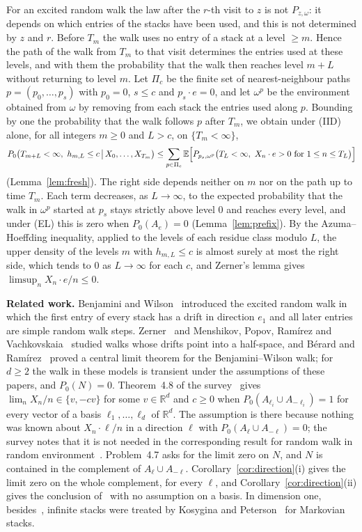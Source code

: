 \documentclass[11pt]{amsart}
\theoremstyle{remark}
\newcommand{\R}{\mathbb{R}}
\newcommand{\E}{\mathbb{E}}
\begin{document}
For an excited random walk the law after the $r$-th visit to $z$ is not $P_{z,\omega}$: it depends on which entries
of the stacks have been used, and this is not determined by $z$ and $r$. Before $T_m$ the walk uses no entry of a stack
at a level $\ge m$. Hence the path of the walk from $T_m$ to that visit determines the entries used at these levels,
and with them the probability that the walk then reaches level $m+L$ without returning to level $m$. Let $\Pi_c$ be the finite set of nearest-neighbour
paths $p=(p_0,\dots,p_s)$ with $p_0=0$, $s\le c$ and $p_s\cdot e=0$, and let $\omega^p$ be the environment obtained
from $\omega$ by removing from each stack the entries used along $p$. Bounding by one the probability that the walk
follows $p$ after $T_m$, we obtain under (IID) alone, for all integers $m\ge0$ and $L>c$, on $\{T_m<\infty\}$,
\[
P_0\bigl(T_{m+L}<\infty,\ h_{m,L}\le c\,\big|\,X_0,\dots,X_{T_m}\bigr)\le
\sum_{p\in\Pi_c}\E\Bigl[P_{p_s,\omega^p}\bigl(T_L<\infty,\ X_n\cdot e>0\text{ for }1\le n\le T_L\bigr)\Bigr]
\]
(Lemma~\ref{lem:fresh}). The right side depends neither on $m$ nor on the path up to time $T_m$. Each term decreases,
as $L\to\infty$, to the expected probability that the walk in $\omega^p$ started at $p_s$ stays strictly above level $0$ and
reaches every level, and under (EL) this is zero when $P_0(A_e)=0$ (Lemma~\ref{lem:prefix}). By the Azuma--Hoeffding
inequality, applied to the levels of each residue class modulo $L$, the upper density of the levels $m$ with
$h_{m,L}\le c$ is almost surely at most the right side, which tends to $0$ as $L\to\infty$ for
each $c$, and Zerner's lemma gives $\limsup_nX_n\cdot e/n\le0$.

\medskip\noindent\textbf{Related work.} Benjamini and Wilson~\cite{BW03} introduced the excited random
walk in which the first entry of every stack has a drift in direction $e_1$ and all later entries are simple random
walk steps. Zerner~\cite{Zer06} and Menshikov, Popov, Ram\'irez and
Vachkovskaia~\cite{MPRV12} studied walks whose drifts point into a half-space, and B\'erard and Ram\'irez~\cite{BR07} proved
a central limit theorem for the Benjamini--Wilson walk; for $d\ge2$ the walk in these models is transient under the assumptions of these papers, and $P_0(N)=0$.
Theorem~4.8 of the survey~\cite{KZ13} gives $\lim_nX_n/n\in\{v,-cv\}$ for some $v\in\R^d$ and $c\ge0$ when
$P_0(A_{\ell_i}\cup A_{-\ell_i})=1$ for every vector of a basis $\ell_1,\dots,\ell_d$ of $\R^d$. The assumption is there
because nothing was known about $X_n\cdot\ell/n$ in a direction $\ell$ with $P_0(A_\ell\cup A_{-\ell})=0$; the survey
notes that it is not needed in the corresponding result for random walk in random environment~\cite[Theorem 1.5]{DR10}.
Problem~4.7 asks for the limit zero on $N$, and $N$ is contained in the complement of $A_\ell\cup A_{-\ell}$.
Corollary~\ref{cor:direction}(i) gives the limit zero on the whole complement, for every $\ell$, and
Corollary~\ref{cor:direction}(ii) gives the conclusion of~\cite[Theorem 4.8]{KZ13} with no assumption on a basis. In dimension one, besides~\cite{ABO16}, infinite stacks
were treated by Kosygina and Peterson~\cite{KP17} for Markovian stacks.
\end{document}
